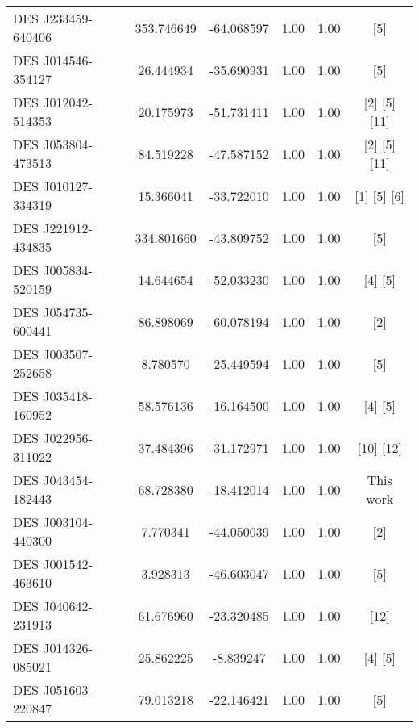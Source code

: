 \documentclass[tradiabstract,twocolumn]{aa}
\begin{document}
{\begin{longtable}{lccccc}
 DES J233459-640406 &  353.746649 & -64.068597 &      1.00 &                    1.00 &                            [5] \\
 DES J014546-354127 &   26.444934 & -35.690931 &      1.00 &                    1.00 &                            [5] \\
 DES J012042-514353 &   20.175973 & -51.731411 &      1.00 &                    1.00 &                 [2]  [5]  [11] \\
 DES J053804-473513 &   84.519228 & -47.587152 &      1.00 &                    1.00 &                 [2]  [5]  [11] \\
 DES J010127-334319 &   15.366041 & -33.722010 &      1.00 &                    1.00 &                  [1]  [5]  [6] \\
 DES J221912-434835 &  334.801660 & -43.809752 &      1.00 &                    1.00 &                            [5] \\
 DES J005834-520159 &   14.644654 & -52.033230 &      1.00 &                    1.00 &                       [4]  [5] \\
 DES J054735-600441 &   86.898069 & -60.078194 &      1.00 &                    1.00 &                            [2] \\
 DES J003507-252658 &    8.780570 & -25.449594 &      1.00 &                    1.00 &                            [5] \\
 DES J035418-160952 &   58.576136 & -16.164500 &      1.00 &                    1.00 &                       [4]  [5] \\
 DES J022956-311022 &   37.484396 & -31.172971 &      1.00 &                    1.00 &                     [10]  [12] \\
 DES J043454-182443 &   68.728380 & -18.412014 &      1.00 &                    1.00 &                      This work \\
 DES J003104-440300 &    7.770341 & -44.050039 &      1.00 &                    1.00 &                            [2] \\
 DES J001542-463610 &    3.928313 & -46.603047 &      1.00 &                    1.00 &                            [5] \\
 DES J040642-231913 &   61.676960 & -23.320485 &      1.00 &                    1.00 &                           [12] \\
 DES J014326-085021 &   25.862225 &  -8.839247 &      1.00 &                    1.00 &                       [4]  [5] \\
 DES J051603-220847 &   79.013218 & -22.146421 &      1.00 &                    1.00 &                            [5] \\

\end{longtable}}
\end{document}
